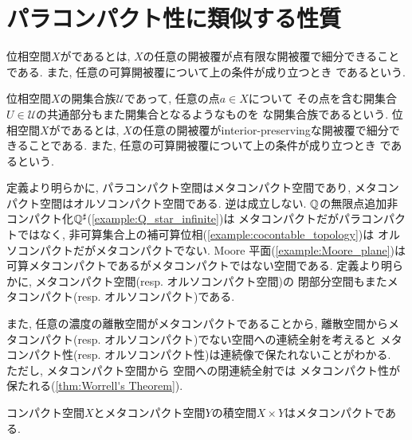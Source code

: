 \documentclass[uplatex, dvipdfmx, a4paper, 12pt, class=jsbook, crop=false]{standalone}
\begin{document}
\section{パラコンパクト性に類似する性質}
\label{sec:paracompact-like-properties}
\newcommand{\imgto}{{}\triangleright{}}
\newcommand{\imgot}{{}\triangleleft{}}

\begin{definition}
	位相空間$ X $がであるとは, 
	$ X $の任意の開被覆が点有限な開被覆で細分できることである.
	また, 任意の可算開被覆について上の条件が成り立つとき
	であるという.
\end{definition}

\begin{definition}
	位相空間$ X $の開集合族$ \mathscr{U} $であって, 任意の点$ a \in X $について
	その点を含む開集合$ U \in \mathscr{U} $の共通部分もまた開集合となるようなものを
	な開集合族であるという.
	位相空間$ X $がであるとは, 
	$ X $の任意の開被覆がinterior-preservingな開被覆で細分できることである. 
	また, 任意の可算開被覆について上の条件が成り立つとき
	であるという.
\end{definition}

定義より明らかに, パラコンパクト空間はメタコンパクト空間であり, メタコンパクト空間はオルソコンパクト空間である. 
逆は成立しない. $ \mathbb{Q} $の無限点追加非コンパクト化$ \mathbb{Q}^\sharp $(\cref{example:Q_star_infinite})は
メタコンパクトだがパラコンパクトではなく, 非可算集合上の補可算位相(\cref{example:cocontable_topology})は
オルソコンパクトだがメタコンパクトでない. 
Moore 平面(\cref{example:Moore_plane})は可算メタコンパクトであるがメタコンパクトではない空間である. 
定義より明らかに, メタコンパクト空間(resp. オルソコンパクト空間)の
閉部分空間もまたメタコンパクト(resp. オルソコンパクト)である. 

また, 任意の濃度の離散空間がメタコンパクトであることから, 
離散空間からメタコンパクト(resp. オルソコンパクト)でない空間への連続全射を考えると
メタコンパクト性(resp. オルソコンパクト性)は連続像で保たれないことがわかる.　
ただし, メタコンパクト空間から \Hausdorff 空間への閉連続全射では
メタコンパクト性が保たれる(\cref{thm:Worrell's Theorem}).

\begin{proposition}
	コンパクト空間$ X $とメタコンパクト空間$ Y $の積空間$ X \times Y $はメタコンパクトである.
\end{proposition}
\end{document}
